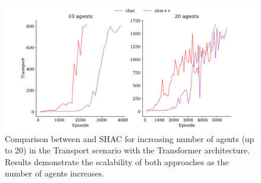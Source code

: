 \begin{figure}[t]
    \centering
    \includegraphics[width=\columnwidth]{figs/transport-high-agents.pdf}
    \caption{Comparison between \fname{} and SHAC for increasing number of agents (up to 20) in the Transport scenario with the Transformer architecture. Results demonstrate the scalability of both approaches as the number of agents increases.}\label{apx:fig:experiments-mlp-20}
    
    \vspace{0.5cm}
\end{figure}


